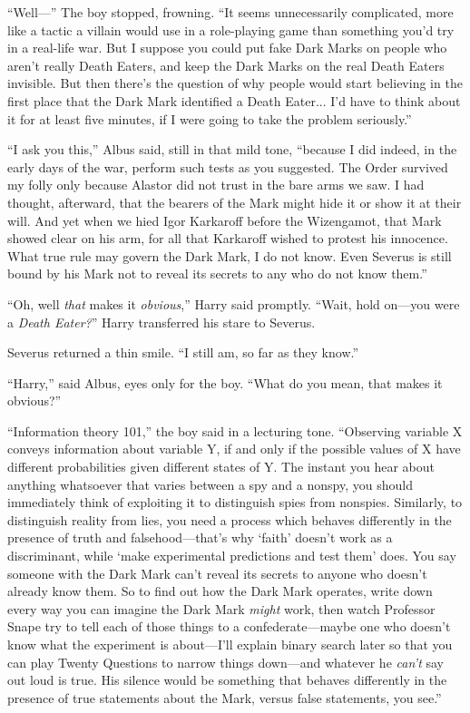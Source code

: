 “Well—” The boy stopped, frowning. “It seems unnecessarily complicated, more like a tactic a villain would use in a role-playing game than something you’d try in a real-life war. But I suppose you could put fake Dark Marks on people who aren’t really Death Eaters, and keep the Dark Marks on the real Death Eaters invisible. But then there’s the question of why people would start believing in the first place that the Dark Mark identified a Death Eater... I’d have to think about it for at least five minutes, if I were going to take the problem seriously.”

“I ask you this,” Albus said, still in that mild tone, “because I did indeed, in the early days of the war, perform such tests as you suggested. The Order survived my folly only because Alastor did not trust in the bare arms we saw. I had thought, afterward, that the bearers of the Mark might hide it or show it at their will. And yet when we hied Igor Karkaroff before the Wizengamot, that Mark showed clear on his arm, for all that Karkaroff wished to protest his innocence. What true rule may govern the Dark Mark, I do not know. Even Severus is still bound by his Mark not to reveal its secrets to any who do not know them.”

“Oh, well \emph{that} makes it \emph{obvious},” Harry said promptly. “Wait, hold on—you were a \emph{Death Eater?}” Harry transferred his stare to Severus.

Severus returned a thin smile. “I still am, so far as they know.”

“Harry,” said Albus, eyes only for the boy. “What do you mean, that makes it obvious?”

“Information theory 101,” the boy said in a lecturing tone. “Observing variable X conveys information about variable Y, if and only if the possible values of X have different probabilities given different states of Y. The instant you hear about anything whatsoever that varies between a spy and a nonspy, you should immediately think of exploiting it to distinguish spies from nonspies. Similarly, to distinguish reality from lies, you need a process which behaves differently in the presence of truth and falsehood—that’s why ‘faith’ doesn’t work as a discriminant, while ‘make experimental predictions and test them’ does. You say someone with the Dark Mark can’t reveal its secrets to anyone who doesn’t already know them. So to find out how the Dark Mark operates, write down every way you can imagine the Dark Mark \emph{might} work, then watch Professor Snape try to tell each of those things to a confederate—maybe one who doesn’t know what the experiment is about—I’ll explain binary search later so that you can play Twenty Questions to narrow things down—and whatever he \emph{can’t} say out loud is true. His silence would be something that behaves differently in the presence of true statements about the Mark, versus false statements, you see.”

